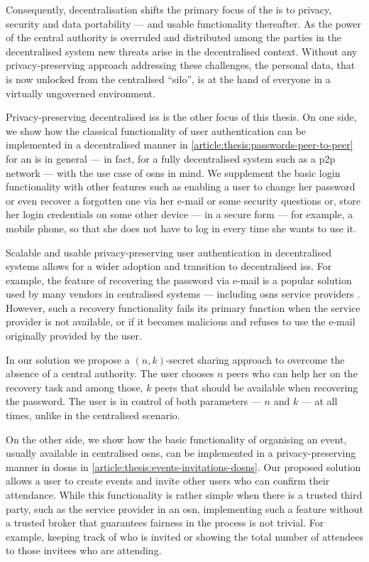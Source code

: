 Consequently, decentralisation shifts the primary focus of the \ac{is} 
to privacy, security and data portability --- and usable functionality thereafter. 
As the power of the central authority is overruled and distributed among the parties 
in the decentralised system new threats arise in the decentralised context. Without 
any privacy-preserving approach addressing these challenges, the personal data, 
that is now unlocked from the centralised ``silo'', is at the hand of everyone in 
a virtually ungoverned environment.

Privacy-preserving decentralised \acp{is} is the other focus of this thesis. On 
one side, we show how the classical functionality of user authentication can be 
implemented in a decentralised manner in \cref{article:thesis:passwords-peer-to-peer} 
for an \ac{is} in general --- in fact, for a fully decentralised system such as 
a \ac{p2p} network --- with the use case of \acp{osn} in mind. We supplement the 
basic login functionality with other features such as enabling a user to change 
her password or even recover a forgotten one via her e-mail or some security questions 
or, store her login credentials on some other device --- in a secure form --- for 
example, a mobile phone, so that she does not have to log in every time she wants 
to use it.

Scalable and usable privacy-preserving user authentication in decentralised systems 
allows for a wider adoption and transition to decentralised \acp{is}. 
For example, the feature of recovering the password via e-mail is a popular solution 
used by many vendors in centralised systems --- including \acp{osn} service providers 
\cite{Kuzma11}. However, such a recovery functionality fails its primary function 
when the service provider is not available, or if it becomes malicious and refuses 
to use the e-mail originally provided by the user. 

In our solution we propose a \((n, k)\)-secret sharing approach to overcome the absence 
of a central authority. The user chooses $n$ peers who can help her on the recovery 
task and among those, $k$ peers that should be available when recovering the password. 
The user is in control of both parameters --- $n$ and $k$ ---  at all times, unlike 
in the centralised scenario.

On the other side, we show how the basic functionality of organising an event, usually 
available in centralised \acp{osn}, can be implemented in a privacy-preserving manner 
in \acp{dosn} in \cref{article:thesis:events-invitations-dosns}. Our proposed solution 
allows a user to create events and invite other users who can confirm their attendance. 
While this functionality is rather simple when there is a trusted third party, such as 
the service provider in an \ac{osn}, implementing such a feature without a trusted 
broker that guarantees fairness in the process is not trivial. For example, keeping 
track of who is invited or showing the total number of attendees to those invitees 
who are attending.

